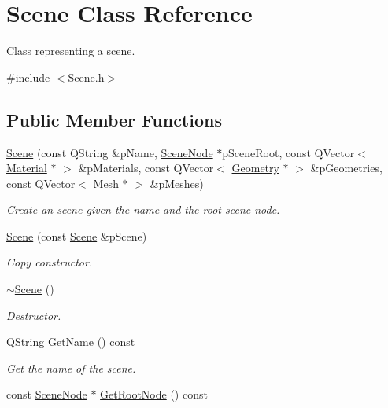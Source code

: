 \hypertarget{class_scene}{\section{Scene Class Reference}
\label{class_scene}
}


Class representing a scene.  




{\ttfamily \#include $<$Scene.\+h$>$}

\subsection*{Public Member Functions}
\begin{DoxyCompactItemize}
\item 
\hyperlink{class_scene_ad9c0170e66dc0fccbd909198715f8dda}{Scene} (const Q\+String \&p\+Name, \hyperlink{class_scene_node}{Scene\+Node} $\ast$p\+Scene\+Root, const Q\+Vector$<$ \hyperlink{class_material}{Material} $\ast$ $>$ \&p\+Materials, const Q\+Vector$<$ \hyperlink{class_geometry}{Geometry} $\ast$ $>$ \&p\+Geometries, const Q\+Vector$<$ \hyperlink{class_mesh}{Mesh} $\ast$ $>$ \&p\+Meshes)
\begin{DoxyCompactList}\small\item\em Create an scene given the name and the root scene node. \end{DoxyCompactList}\item 
\hyperlink{class_scene_a21d9c54cb4b853fead9bdffb4af9a10f}{Scene} (const \hyperlink{class_scene}{Scene} \&p\+Scene)
\begin{DoxyCompactList}\small\item\em Copy constructor. \end{DoxyCompactList}\item 
\hyperlink{class_scene_a3b8cec2e32546713915f8c6303c951f1}{$\sim$\+Scene} ()
\begin{DoxyCompactList}\small\item\em Destructor. \end{DoxyCompactList}\item 
Q\+String \hyperlink{class_scene_aeaf251862f521c36965af404fd7f5798}{Get\+Name} () const 
\begin{DoxyCompactList}\small\item\em Get the name of the scene. \end{DoxyCompactList}\item 
const \hyperlink{class_scene_node}{Scene\+Node} $\ast$ \hyperlink{class_scene_ad498e6d055044b8893579df09b2aa07a}{Get\+Root\+Node} () const 

\end{DoxyCompactItemize}
